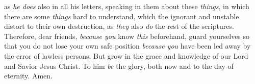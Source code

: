 \begin{biblechapter}
\verse as \textit{he does} also in all his﻿ letters, speaking in them about these \textit{things}, in which there are some \textit{things} hard to understand, which the ignorant and unstable distort to their own destruction, as \textit{they} also \textit{do} the rest of the scriptures.
\verse Therefore, dear friends, \textit{because you} know \textit{this} beforehand, guard yourselves so that you do not lose your own safe position \textit{because you} have been led away by the error of lawless persons.
\verse But grow in the grace and knowledge of our Lord and Savior Jesus Christ. To him \textit{be} the glory, both now and to the day of eternity. Amen.
\end{biblechapter}

